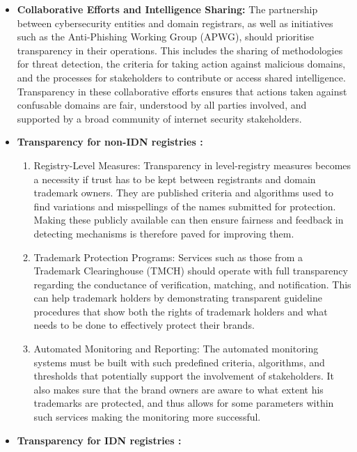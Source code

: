 \begin{itemize}
  \item \textbf{Collaborative Efforts and Intelligence Sharing: }The partnership between cybersecurity entities and domain registrars, as well as initiatives such as the Anti-Phishing Working Group (APWG), should prioritise transparency in their operations. This includes the sharing of methodologies for threat detection, the criteria for taking action against malicious domains, and the processes for stakeholders to contribute or access shared intelligence. Transparency in these collaborative efforts ensures that actions taken against confusable domains are fair, understood by all parties involved, and supported by a broad community of internet security stakeholders.
  
 \item \textbf{Transparency for non-IDN registries : } 

 \begin{enumerate}
  \item Registry-Level Measures: Transparency in level-registry measures becomes a necessity if trust has to be kept between registrants and domain trademark owners. They are published criteria and algorithms used to find variations and misspellings of the names submitted for protection. Making these publicly available can then ensure fairness and feedback in detecting mechanisms is therefore paved for improving them.
  \item Trademark Protection Programs: Services such as those from a Trademark Clearinghouse (TMCH) should operate with full transparency regarding the conductance of verification, matching, and notification. This can help trademark holders by demonstrating transparent guideline procedures that show both the rights of trademark holders and what needs to be done to effectively protect their brands.
  \item Automated Monitoring and Reporting: The automated monitoring systems must be built with such predefined criteria, algorithms, and thresholds that potentially support the involvement of stakeholders. It also makes sure that the brand owners are aware to what extent his trademarks are protected, and thus allows for some parameters within such services making the monitoring more successful.
\end{enumerate}
 
 \item \textbf{Transparency for IDN registries  : } 


\end{itemize}
